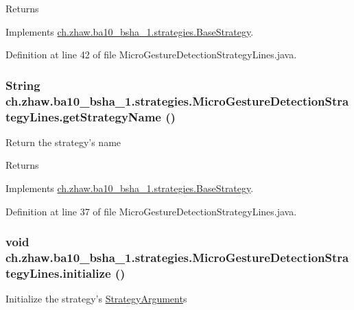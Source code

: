 \begin{DoxyReturn}{Returns}

\end{DoxyReturn}


Implements \hyperlink{classch_1_1zhaw_1_1ba10__bsha__1_1_1strategies_1_1BaseStrategy_a75fdb36932ad701f6375cc1fe718056b}{ch.zhaw.ba10\_\-bsha\_\-1.strategies.BaseStrategy}.

Definition at line 42 of file MicroGestureDetectionStrategyLines.java.\hypertarget{classch_1_1zhaw_1_1ba10__bsha__1_1_1strategies_1_1MicroGestureDetectionStrategyLines_a9e856240313caac95a363e99bfac2474}{
\subsubsection[{getStrategyName}]{\setlength{\rightskip}{0pt plus 5cm}String ch.zhaw.ba10\_\-bsha\_\-1.strategies.MicroGestureDetectionStrategyLines.getStrategyName ()}}
\label{classch_1_1zhaw_1_1ba10__bsha__1_1_1strategies_1_1MicroGestureDetectionStrategyLines_a9e856240313caac95a363e99bfac2474}
Return the strategy's name

\begin{DoxyReturn}{Returns}

\end{DoxyReturn}


Implements \hyperlink{classch_1_1zhaw_1_1ba10__bsha__1_1_1strategies_1_1BaseStrategy_aa0ebed55eed45409bad13d43a0058780}{ch.zhaw.ba10\_\-bsha\_\-1.strategies.BaseStrategy}.

Definition at line 37 of file MicroGestureDetectionStrategyLines.java.\hypertarget{classch_1_1zhaw_1_1ba10__bsha__1_1_1strategies_1_1MicroGestureDetectionStrategyLines_a17861d2a4eaa204c4dc86de1633c0f8c}{
\subsubsection[{initialize}]{\setlength{\rightskip}{0pt plus 5cm}void ch.zhaw.ba10\_\-bsha\_\-1.strategies.MicroGestureDetectionStrategyLines.initialize ()}}
\label{classch_1_1zhaw_1_1ba10__bsha__1_1_1strategies_1_1MicroGestureDetectionStrategyLines_a17861d2a4eaa204c4dc86de1633c0f8c}
Initialize the strategy's \hyperlink{classch_1_1zhaw_1_1ba10__bsha__1_1_1StrategyArgument}{StrategyArgument}s 

